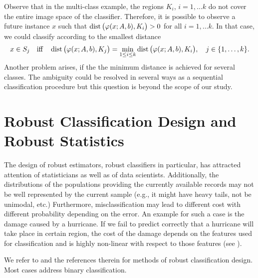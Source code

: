 \documentclass[10pt,letterpaper]{article}
\newcommand{\1}{1{\hskip -2.55 pt}\hbox{I}}
\newcommand{\dist}{\mathop{\rm dist}}
\newtheorem{example}{Example}
\begin{document}
Observe that in the multi-class example, the regions $K_i$, $i=1,\dots k$ do not cover the entire image space of the classifier. Therefore, it is possible to observe a future instance $x$ such that $\dist \big(\varphi(x; A,b), K_i\big)>0$ for all $i=1,\dots k$. 
In that case,  we could classify according to the smallest distance 
\[
x\in S_j\quad \text{iff} \quad \dist \big(\varphi(x; A,b), K_j\big)= \min_{1\leq i\leq k} \dist \big(\varphi(x; A,b), K_i\big),\quad j\in\{1,\dots,k\}.
\]
Another problem arises, if the the minimum distance is achieved for several classes. The ambiguity could be resolved in several ways as a sequential classification procedure but this question is beyond the scope of our study.




\section{Robust Classification Design and Robust Statistics}

The design of robust estimators, robust classifiers in particular, has attracted attention of statisticians as well as of data scientists. Additionally, the distributions of the populations providing the currently available records may not be well represented by the current sample (e.g., it might have heavy tails, not be unimodal, etc.)
Furthermore, misclassification may lead to different cost with different probability depending on the error. An example for such a case is the damage caused by a hurricane. If we fail to predict correctly that a hurricane will take place in certain region, the cost of the damage depends on the features used for classification  and is highly non-linear with respect to those features (see \cite{davis2016analysis}).

We refer to \cite{huber2011robust,el2003robust,gotoh2017support,hastie2009elements} and the references therein for methods of robust classification design.
Most cases address binary classification. 
\end{document}
